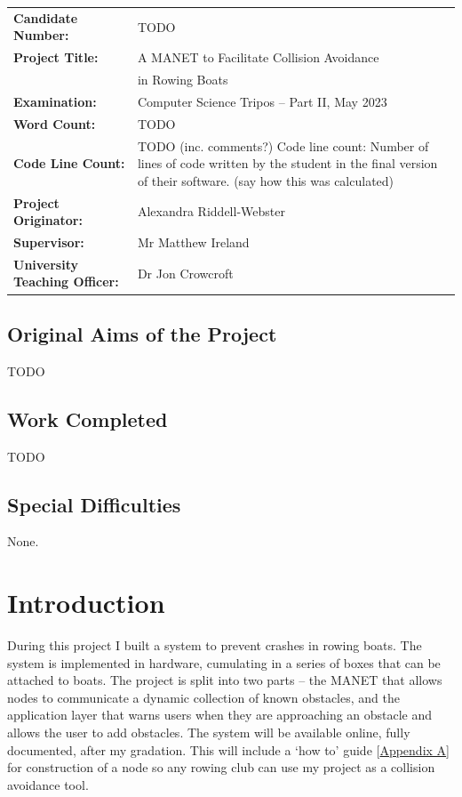 \documentclass[12pt,a4paper]{report}
\newcommand{\newchapter}[2]{
    \setcounter{chapter}{#1}
    \setcounter{section}{0}
    \chapter*{#2}
    \addcontentsline{toc}{chapter}{#1 #2}
}
\begin{document}
{\large
\begin{tabular}{ll}
\bf Candidate Number:   & TODO \\
\bf Project Title:  & A MANET to Facilitate Collision Avoidance \\
& in Rowing Boats \\
\bf Examination:  & Computer Science Tripos -- Part II, May 2023      \\
\bf Word Count:    & TODO \footnotemark[1]   \\
\bf Code Line Count:    & TODO (inc. comments?) Code line count: Number of lines of code written by the student in the final version of their software. (say how this was calculated)\\
\bf Project Originator: & Alexandra Riddell-Webster                 \\
\bf Supervisor:         & Mr Matthew Ireland  \\ 
\bf University Teaching Officer:  & Dr Jon Crowcroft \\ 
\end{tabular}
}


\section*{Original Aims of the Project}
TODO

\section*{Work Completed}
TODO

\section*{Special Difficulties}
None.


\newpage
{
\hypersetup{linkcolor=black}
\tableofcontents
}

\newchapter{1}{Introduction}
During this project I built a system to prevent crashes in rowing boats. The system is implemented in hardware, cumulating in a series of boxes that can be attached to boats. The project is split into two parts -- the MANET that allows nodes to communicate a dynamic collection of known obstacles, and the application layer that warns users when they are approaching an obstacle and allows the user to add obstacles. The system will be available online, fully documented, after my gradation. This will include a `how to' guide [\hyperref[appendixA]{Appendix A}] for construction of a node so any rowing club can use my project as a collision avoidance tool.    
\end{document}
